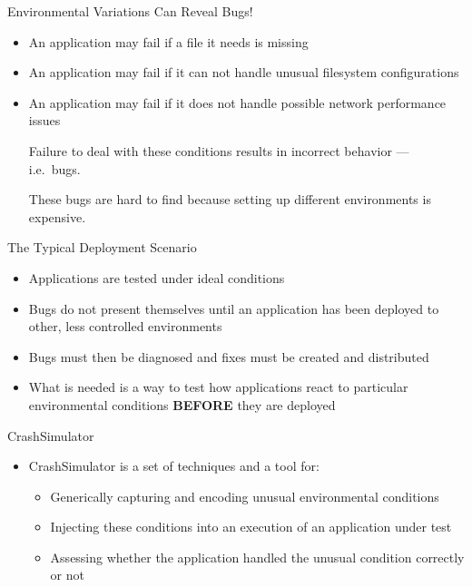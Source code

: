 \documentclass[pdf]{beamer}
\begin{document}
\begin{frame}{Environmental Variations Can Reveal Bugs!}
  \begin{itemize}
  \item{An application may fail if a file it needs is missing}
  \item{An application may fail if it can not handle unusual filesystem configurations}
  \item{An application may fail if it does not handle possible network
      performance issues}

    Failure to deal with these conditions results in incorrect behavior --- i.e.\ bugs.

    These bugs are hard to find because setting up different environments is
    expensive.
  \end{itemize}
\end{frame}


\begin{frame}{The Typical Deployment Scenario}
  \begin{itemize}
  \item{Applications are tested under ideal conditions}
  \item{Bugs do not present themselves until an application has
      been deployed to other, less controlled environments}
  \item{Bugs must then be diagnosed and fixes must be created and distributed}
  \item{What is needed is a way to test how applications react to particular
      environmental conditions \textbf{BEFORE} they are deployed}
  \end{itemize}
\end{frame}


\begin{frame}{CrashSimulator}
  \begin{itemize}
  \item{CrashSimulator is a set of techniques and a tool for:}
    \begin{itemize}
    \item{Generically capturing and encoding unusual environmental conditions}
    \item{Injecting these conditions into an execution of an application under
        test}
    \item{Assessing whether the application handled the unusual condition correctly or not}
    \end{itemize}
  \end{itemize}
\end{frame}
\end{document}
